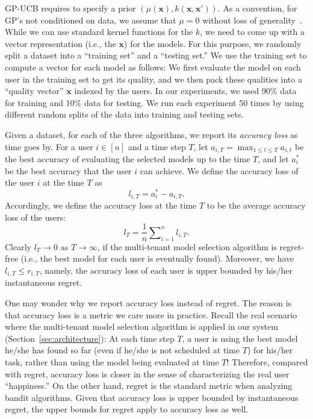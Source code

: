 \documentclass[letterpaper]{vldb}
\begin{document}
GP-UCB requires to specify a prior $(\mu(\mathbf{x}), k(\mathbf{x},\mathbf{x}'))$.
As a convention, for GP's not conditioned on data, we assume that $\mu=0$ without loss of generality~\cite{SrinivasKKS10}.
While we can use standard kernel functions for the $k$, we need to come up with a vector representation (i.e., the $\mathbf{x}$) for the models.
For this purpose, we randomly split a dataset into a ``training set'' and a ``testing set.''
We use the training set to compute a vector for each model as follows:
We first evaluate the model on each user in the training set to get its quality, and we then pack these qualities into a ``quality vector'' $\mathbf{x}$ indexed by the users.
In our experiments, we used 90\% data for training and 10\% data for testing.
We run each experiment 50 times by using different random splits of the data into training and testing sets.

Given a dataset, for each of the three algorithms, we report its \emph{accuracy loss} as time goes by.
For a user $i\in[n]$ and a time step $T$, let $a_{i,T}=\max_{1\leq t\leq T} a_{i,t}$ be the best accuracy of evaluating the selected models up to the time $T$, and let $a_i^{*}$ be the best accuracy that the user $i$ can achieve.
We define the accuracy loss of the user $i$ at the time $T$ as
\begin{equation}
l_{i,T}=a_i^{*}-a_{i,T}.
\end{equation}
Accordingly, we define the accuracy loss at the time $T$ to be the average accuracy loss of the users:
\begin{equation}\label{eq:accuracy-loss}
l_T=\frac{1}{n}\sum\nolimits_{i=1}^{n}l_{i,T}.
\end{equation}
Clearly $l_T\to 0$ as $T\to\infty$, if the multi-tenant model selection algorithm is regret-free (i.e., the best model for each user is eventually found).
Moreover, we have $l_{i,T}\leq r_{i,T}$, namely, the accuracy loss of each user is upper bounded by his/her instantaneous regret.

One may wonder why we report accuracy loss instead of regret.
The reason is that accuracy loss is a metric we care more in practice.
Recall the real scenario where the multi-tenant model selection algorithm is applied in our system (Section~\ref{sec:architecture}): At each time step $T$, a user is using the best model he/she has found so far (even if he/she is not scheduled at time $T$) for his/her task, rather than using the model being evaluated at time $T$!
Therefore, compared with regret, accuracy loss is closer in the sense of characterizing the real user ``happiness.''
On the other hand, regret is the standard metric when analyzing bandit algorithms.
Given that accuracy loss is upper bounded by instantaneous regret, the upper bounds for regret apply to accuracy loss as well.%
\end{document}

